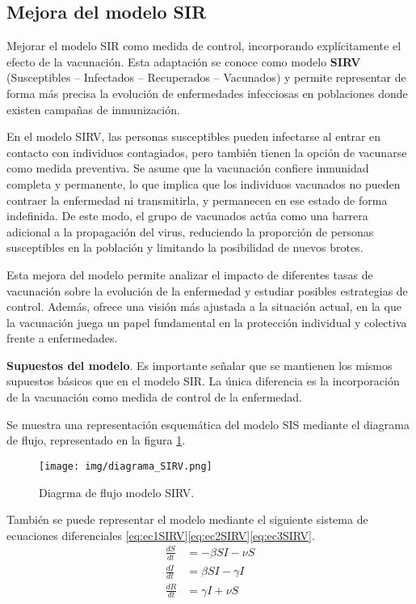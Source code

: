 \subsection{Mejora del modelo SIR}
Mejorar el modelo SIR como medida de control, incorporando explícitamente el efecto de la vacunación. Esta adaptación se conoce como modelo \textbf{SIRV} (Susceptibles – Infectados – Recuperados – Vacunados) y permite representar de forma más precisa la evolución de enfermedades infecciosas en poblaciones donde existen campañas de inmunización.

En el modelo SIRV, las personas susceptibles pueden infectarse al entrar en contacto con individuos contagiados, pero también tienen la opción de vacunarse como medida preventiva. Se asume que la vacunación confiere inmunidad completa y permanente, lo que implica que los individuos vacunados no pueden contraer la enfermedad ni transmitirla, y permanecen en ese estado de forma indefinida. De este modo, el grupo de vacunados actúa como una barrera adicional a la propagación del virus, reduciendo la proporción de personas susceptibles en la población y limitando la posibilidad de nuevos brotes.

Esta mejora del modelo permite analizar el impacto de diferentes tasas de vacunación sobre la evolución de la enfermedad y estudiar posibles estrategias de control. Además, ofrece una visión más ajustada a la situación actual, en la que la vacunación juega un papel fundamental en la protección individual y colectiva frente a enfermedades.

\textbf{Supuestos del modelo}. Es importante señalar que se mantienen los mismos supuestos básicos que en el modelo SIR. La única diferencia es la incorporación de la vacunación como medida de control de la enfermedad.

Se muestra una representación esquemática del modelo SIS mediante el diagrama de flujo, representado en la figura \ref{fig:ejemplo SIRV}.

\begin{figure}[H]
    \centering
    \texttt{[image: img/diagrama\_SIRV.png]}
    \caption{Diagrma de flujo modelo SIRV.}
    \label{fig:ejemplo SIRV}
    
\end{figure}

También se puede representar el modelo mediante el siguiente sistema de ecuaciones diferenciales \eqref{eq:ec1SIRV}\eqref{eq:ec2SIRV}\eqref{eq:ec3SIRV}.
\begin{align}
\frac{dS}{dt} &= -\beta SI - \nu S \label{eq:ec1SIRV} \\
\frac{dI}{dt} &= \beta SI - \gamma I \label{eq:ec2SIRV} \\
\frac{dR}{dt} &= \gamma I + \nu S \label{eq:ec3SIRV}
\end{align}

